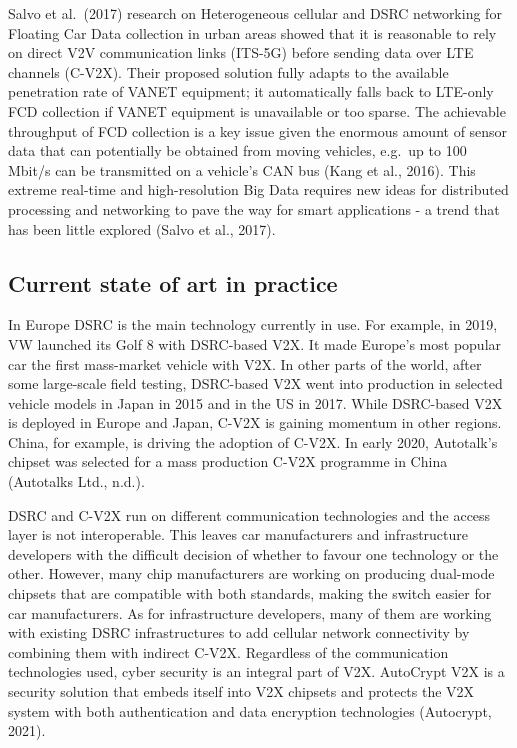 \documentclass[
]{book}
\begin{document}
Salvo et al.~(2017) research on Heterogeneous cellular and DSRC networking for Floating Car Data collection in urban areas showed that it is reasonable to rely on direct V2V communication links (ITS-5G) before sending data over LTE channels (C-V2X). Their proposed solution fully adapts to the available penetration rate of VANET equipment; it automatically falls back to LTE-only FCD collection if VANET equipment is unavailable or too sparse. The achievable throughput of FCD collection is a key issue given the enormous amount of sensor data that can potentially be obtained from moving vehicles, e.g.~up to 100 Mbit/s can be transmitted on a vehicle's CAN bus (Kang et al., 2016). This extreme real-time and high-resolution Big Data requires new ideas for distributed processing and networking to pave the way for smart applications - a trend that has been little explored (Salvo et al., 2017).

\hypertarget{current-state-of-art-in-practice-41}{%
\subsection*{Current state of art in practice}\label{current-state-of-art-in-practice-41}}

In Europe DSRC is the main technology currently in use. For example, in 2019, VW launched its Golf 8 with DSRC-based V2X. It made Europe's most popular car the first mass-market vehicle with V2X. In other parts of the world, after some large-scale field testing, DSRC-based V2X went into production in selected vehicle models in Japan in 2015 and in the US in 2017. While DSRC-based V2X is deployed in Europe and Japan, C-V2X is gaining momentum in other regions. China, for example, is driving the adoption of C-V2X. In early 2020, Autotalk's chipset was selected for a mass production C-V2X programme in China (Autotalks Ltd., n.d.).

DSRC and C-V2X run on different communication technologies and the access layer is not interoperable. This leaves car manufacturers and infrastructure developers with the difficult decision of whether to favour one technology or the other. However, many chip manufacturers are working on producing dual-mode chipsets that are compatible with both standards, making the switch easier for car manufacturers. As for infrastructure developers, many of them are working with existing DSRC infrastructures to add cellular network connectivity by combining them with indirect C-V2X. Regardless of the communication technologies used, cyber security is an integral part of V2X. AutoCrypt V2X is a security solution that embeds itself into V2X chipsets and protects the V2X system with both authentication and data encryption technologies (Autocrypt, 2021).
\end{document}
